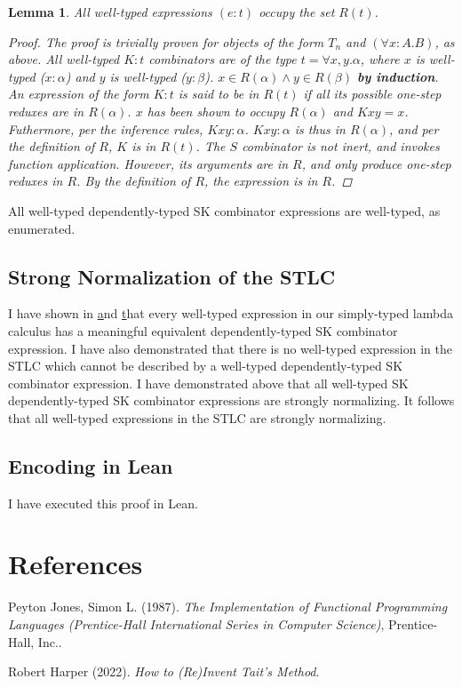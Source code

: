 \documentclass[11pt]{article}
\newtheorem{lemma}[theorem]{Lemma}
\begin{document}
\begin{enumerate}
\begin{lemma}
All well-typed expressions $(e : t)$ occupy the set $R(t)$.
\begin{proof}
The proof is trivially proven for objects of the form $T_{n}$ and $(\forall x:A.B)$, as above.
All well-typed $K : t$ combinators are of the type $t = \forall x, y.\alpha$, where $x$ is well-typed ($x : \alpha$) and $y$ is well-typed ($y : \beta$).
$x \in R(\alpha) \land y \in R(\beta)$ \textbf{by induction}.
An expression of the form $K : t$ is said to be in $R(t)$ if all its possible one-step reduxes are in $R(\alpha)$.
$x$ has been shown to occupy $R(\alpha)$ and $K x y = x$. Futhermore, per the inference rules, $K x y : \alpha$. $K x y : \alpha$ is thus in $R(\alpha)$,
and per the definition of $R$, $K$ is in $R(t)$. The $S$ combinator is not inert, and invokes function application. However, its arguments are in $R$, and only produce one-step reduxes in $R$. By the definition of $R$, the expression is in $R$.
\end{proof}
\end{lemma}

All well-typed dependently-typed SK combinator expressions are well-typed, as enumerated.
\end{enumerate}
\subsection{Strong Normalization of the STLC}
\label{sec:org7c3b156}

I have shown in \href{decomplemma:1} and \href{maplemma:1} that every well-typed expression in our simply-typed lambda calculus has a meaningful equivalent dependently-typed SK combinator expression.
I have also demonstrated that there is no well-typed expression in the STLC which cannot be described by a well-typed dependently-typed SK combinator expression.
I have demonstrated above that all well-typed SK dependently-typed SK combinator expressions are strongly normalizing. It follows that all well-typed expressions in the STLC are strongly normalizing.
\subsection{Encoding in Lean}
\label{sec:orgd5c54d1}

I have executed this proof in Lean.
\section{References}
\label{sec:orgaa7ad31}

\noindent
Peyton Jones, Simon L. (1987). \emph{The Implementation of Functional Programming Languages (Prentice-Hall International Series in Computer Science)}, Prentice-Hall, Inc..

\noindent
Robert Harper (2022). \emph{How to (Re)Invent Tait’s Method}.
\end{document}
